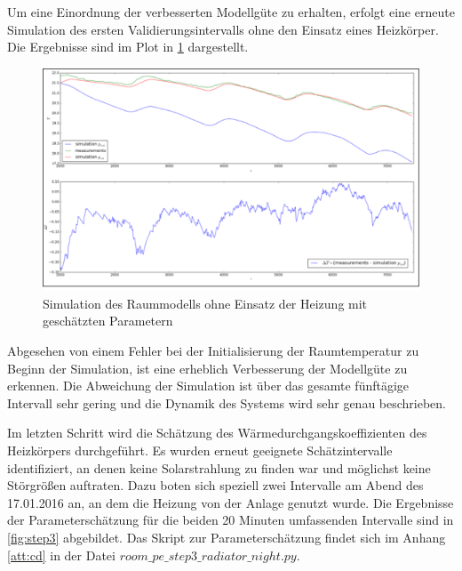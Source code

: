 Um eine Einordnung der verbesserten Modellgüte zu erhalten, erfolgt eine erneute Simulation des ersten Validierungsintervalls ohne den Einsatz eines Heizkörper. Die Ergebnisse sind im Plot in \ref{fig:valid1pe} dargestellt.

\begin{figure}
\centering
\includegraphics[width=\textwidth]{abbildungen/20160329_validierung1pe}
\caption{Simulation des Raummodells ohne Einsatz der Heizung mit geschätzten Parametern}
\label{fig:valid1pe}
\end{figure}

Abgesehen von einem Fehler bei der Initialisierung der Raumtemperatur zu Beginn der Simulation, ist eine erheblich Verbesserung der Modellgüte zu erkennen. Die Abweichung der Simulation ist über das gesamte fünftägige Intervall sehr gering und die Dynamik des Systems wird sehr genau beschrieben.

Im letzten Schritt wird die Schätzung des Wärmedurchgangskoeffizienten des Heizkörpers durchgeführt. Es wurden erneut geeignete Schätzintervalle identifiziert, an denen keine Solarstrahlung zu finden war und möglichst keine Störgrößen auftraten. Dazu boten sich speziell zwei Intervalle am Abend des 17.01.2016 an, an dem die Heizung von der Anlage genutzt wurde. Die Ergebnisse der Parameterschätzung für die beiden 20 Minuten umfassenden Intervalle sind in \ref{fig:step3} abgebildet. Das Skript zur Parameterschätzung findet sich im Anhang \ref{att:cd} in der Datei $room\_pe\_step3\_radiator\_night.py$.

